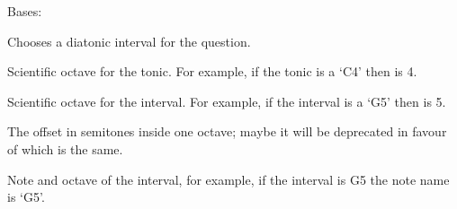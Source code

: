 \documentclass[letterpaper,10pt,english]{sphinxmanual}
\begin{document}
\begin{fulllineitems}
\label{\detokenize{index:birdears.interval.ChromaticInterval}}
Bases: {\hyperref[\detokenize{index:birdears.interval.IntervalBase}]{}}

Chooses a diatonic interval for the question.

\begin{fulllineitems}
\label{\detokenize{index:birdears.interval.ChromaticInterval.tonic_octave}}
 \textendash{} Scientific octave for the tonic. For example, if
the tonic is a ‘C4’ then  is 4.

\end{fulllineitems}



\begin{fulllineitems}
 \textendash{} Scientific octave for the interval. For example,
if the interval is a ‘G5’ then  is 5.

\end{fulllineitems}


\begin{fulllineitems}
\label{\detokenize{index:birdears.interval.ChromaticInterval.chromatic_offset}}
 \textendash{} The offset in semitones inside one octave;
maybe it will be deprecated in favour of 
which is the same.

\end{fulllineitems}


\begin{fulllineitems}
\label{\detokenize{index:birdears.interval.ChromaticInterval.note_and_octave}}
 \textendash{} Note and octave of the interval, for example, if
the interval is G5 the note name is ‘G5’.


\end{fulllineitems}
\end{fulllineitems}
\end{document}
